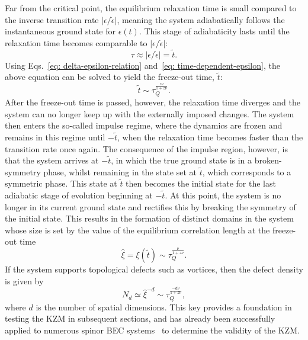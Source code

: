 Far from the critical point, the equilibrium relaxation time is small compared
to the inverse transition rate \( |\epsilon/\dot{\epsilon}| \), meaning the
system adiabatically follows the instantaneous ground state for \(\epsilon(t)\).
This stage of adiabaticity lasts until the relaxation time becomes comparable
to \(|\epsilon / \dot{\epsilon}|\):
\begin{equation}
    \tau \approx |\epsilon/\dot{\epsilon}|=\tilde{t}.
    \label{eq: freeze-out-equal}
\end{equation}
Using Eqs.~\eqref{eq: delta-epsilon-relation}
and~\eqref{eq: time-dependent-epsilon}, the above equation can be solved to
yield the freeze-out time, \( \tilde{t} \):
\begin{equation}
    \tilde{t} \sim \tau_Q^\frac{z\nu}{1 + z\nu}.
    \label{eq: freeze-out-scaling}
\end{equation}
After the freeze-out time is passed, however, the relaxation time diverges and
the system can no longer keep up with the externally imposed changes.
The system then enters the so-called impulse regime, where the dynamics are
frozen and remains in this regime until \( -\tilde{t} \), when the relaxation
time becomes faster than the transition rate once again.
The consequence of the impulse region, however, is that the system arrives at
\( -\tilde{t} \), in which the true ground state is in a broken-symmetry phase,
whilst remaining in the state set at \( \tilde{t} \), which corresponds to a
symmetric phase.
This state at \( \tilde{t} \) then becomes the initial state for the last
adiabatic stage of evolution beginning at \( -\tilde{t} \).
At this point, the system is no longer in its current ground state and rectifies
this by breaking the symmetry of the initial state.
This results in the formation of distinct domains in the system whose size is
set by the value of the equilibrium correlation length at the freeze-out time
\begin{equation}
    \hat{\xi}=\xi(\tilde{t}) \sim \tau_Q^{\frac{\nu}{1 + z\nu}}.
    \label{eq: KZM-domain-size}
\end{equation}
If the system supports topological defects such as vortices, then the defect
density is given by
\begin{equation}\label{eq: KZM-defects-scaling}
    N_d \simeq \hat{\xi}^{-d} \sim \tau_Q^{\frac{-d\nu}{1+z\nu}},
\end{equation}
where \( d \) is the number of spatial dimensions.
This key provides a foundation in testing the KZM in subsequent sections, and
has already been successfully applied to numerous spinor BEC
systems~\cite{Damski2007, Swislocki2013, Anquez2016, Saito2007, Saito2007a} to
determine the validity of the KZM\@.

